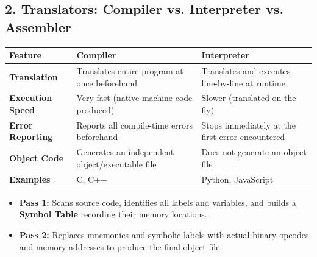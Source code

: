 \documentclass[a4paper,11pt]{article}
\begin{document}
\subsection{2. Translators: Compiler vs. Interpreter vs. Assembler}
\begin{center}
\small
\renewcommand{\arraystretch}{1.2}
\begin{tabular}{@{}l p{6cm} p{6cm}@{}}
\toprule
\textbf{Feature} & \textbf{Compiler} & \textbf{Interpreter} \\
\midrule
\textbf{Translation} & Translates entire program at once beforehand & Translates and executes line-by-line at runtime \\
\textbf{Execution Speed} & Very fast (native machine code produced) & Slower (translated on the fly) \\
\textbf{Error Reporting} & Reports all compile-time errors beforehand & Stops immediately at the first error encountered \\
\textbf{Object Code} & Generates an independent object/executable file & Does not generate an object file \\
\textbf{Examples} & C, C++ & Python, JavaScript \\
\bottomrule
\end{tabular}
\end{center}

\begin{handwbox}
\begin{itemize}[leftmargin=5mm]
    \item \textbf{Pass 1:} Scans source code, identifies all labels and variables, and builds a \textbf{Symbol Table} recording their memory locations.
    \item \textbf{Pass 2:} Replaces mnemonics and symbolic labels with actual binary opcodes and memory addresses to produce the final object file.
\end{itemize}
\end{handwbox}
\end{document}
